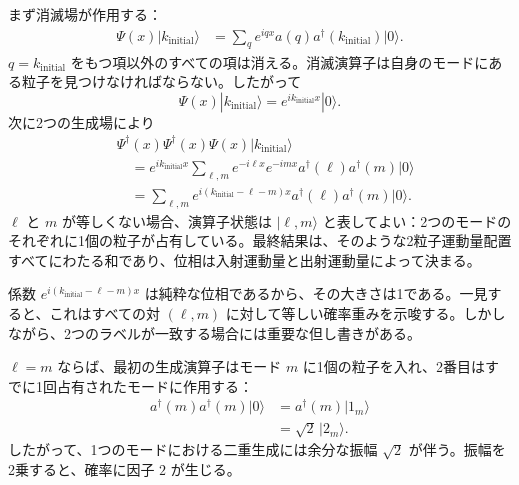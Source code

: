 まず消滅場が作用する：
\begin{align}
\Psi(x)|k_{\mathrm{initial}}\rangle
&=\sum_q e^{iqx}a(q)a^\dagger(k_{\mathrm{initial}})|0\rangle.
\end{align}
\(q=k_{\mathrm{initial}}\) をもつ項以外のすべての項は消える。消滅演算子は自身のモードにある粒子を見つけなければならない。したがって
\begin{equation}
\Psi(x)|k_{\mathrm{initial}}\rangle
=e^{ik_{\mathrm{initial}}x}|0\rangle.
\end{equation}
次に2つの生成場により
\begin{align}
&\Psi^\dagger(x)\Psi^\dagger(x)\Psi(x)
|k_{\mathrm{initial}}\rangle
\\
&\quad=
e^{ik_{\mathrm{initial}}x}
\sum_{\ell,m}
e^{-i\ell x}e^{-imx}
a^\dagger(\ell)a^\dagger(m)|0\rangle
\\
&\quad=
\sum_{\ell,m}
e^{i(k_{\mathrm{initial}}-\ell-m)x}
a^\dagger(\ell)a^\dagger(m)|0\rangle.
\end{align}
\(\ell\) と \(m\) が等しくない場合、演算子状態は \(|\ell,m\rangle\) と表してよい：2つのモードのそれぞれに1個の粒子が占有している。最終結果は、そのような2粒子運動量配置すべてにわたる和であり、位相は入射運動量と出射運動量によって決まる。

\begin{classroomqa}
\end{classroomqa}

\begin{classroomqa}
\end{classroomqa}

係数 \(e^{i(k_{\mathrm{initial}}-\ell-m)x}\) は純粋な位相であるから、その大きさは1である。一見すると、これはすべての対 \((\ell,m)\) に対して等しい確率重みを示唆する。しかしながら、2つのラベルが一致する場合には重要な但し書きがある。

\(\ell=m\) ならば、最初の生成演算子はモード \(m\) に1個の粒子を入れ、2番目はすでに1回占有されたモードに作用する：
\begin{align}
a^\dagger(m)a^\dagger(m)|0\rangle
&=a^\dagger(m)|1_m\rangle\\
&=\sqrt{2}\,|2_m\rangle.
\end{align}
したがって、1つのモードにおける二重生成には余分な振幅 \(\sqrt{2}\) が伴う。振幅を2乗すると、確率に因子 \(2\) が生じる。

